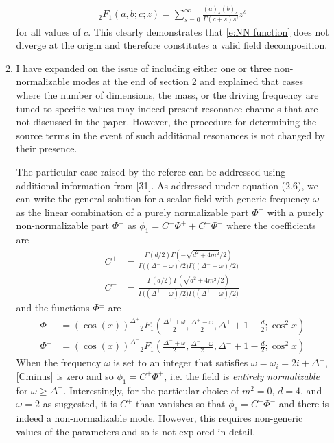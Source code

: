 \documentclass[11pt,letterpaper]{article}
\begin{document}
\begin{enumerate}
\begin{enumerate}
\begin{align}
            {_2}F_1 (a, b; c; z) = \sum_{s = 0}^\infty \frac{(a)_s (b)_s}{\Gamma(c + s) s!} z^s
        \end{align}
        for all values of $c$. This clearly demonstrates that \eqref{e:NN function} does not
        diverge at the origin and therefore constitutes a valid field decomposition.
        \item I have expanded on the issue of including either one or three non-normalizable modes at the end of section 2 and explained that cases where the number of dimensions, the mass, or the driving frequency are tuned to specific values may indeed present resonance channels that are not discussed in the paper. However, the procedure for determining the source terms in the event of such additional resonances is not changed by their presence. 
        
        The particular case raised by the referee can be addressed using additional information from [31]. As addressed under equation (2.6), we can write the general solution for a scalar field with generic frequency $\omega$ as the linear combination of a purely normalizable part $\Phi^+$ with a purely non-normalizable part $\Phi^-$ as ${\phi_1 = C^+ \Phi^+ + C^- \Phi^-}$ where the coefficients are
        \begin{align}
            \label{Cplus}
            C^+ &= \frac{\Gamma(d/2) \Gamma(- \sqrt{d^2 + 4m^2} / 2)}{\Gamma\Big( (\Delta^- + \omega)/2 \Big) \Gamma\Big( (\Delta^- - \omega) / 2 \Big)} \\
            \label{Cminus}
            C^- &= \frac{\Gamma(d/2) \Gamma(\sqrt{d^2 + 4m^2} / 2)}{\Gamma \Big( (\Delta^+ + \omega) / 2 \Big) \Gamma \Big( (\Delta^+ - \omega) / 2 \Big)} \, 
        \end{align}
        and the functions $\Phi^\pm$ are
        \begin{align}
            \label{Phiplus}
            \Phi^+ &= \left( \cos(x) \right)^{\Delta^+} {_2}F_1 \left( \frac{\Delta^+ + \omega}{2}, \frac{\Delta^+ - \omega}{2}, \Delta^+ +1 - \frac{d}{2}; \cos^2 x \right) \\
            \label{Phiminus}
            \Phi^- &= \left( \cos(x) \right)^{\Delta^-} {_2}F_1 \left( \frac{\Delta^- + \omega}{2}, \frac{\Delta^- - \omega}{2}, \Delta^- + 1 - \frac{d}{2} ; \cos^2 x \right)
        \end{align}
        When the frequency $\omega$ is set to an integer that satisfies ${\omega = \omega_i = 2i + \Delta^+}$, \eqref{Cminus} is zero and so $\phi_1 = C^+ \Phi^+$, i.e. the field is \emph{entirely normalizable} for $\omega \geq \Delta^+$. Interestingly, for the particular choice of $m^2 = 0$, $d=4$, and $\omega = 2$ as suggested, it is $C^+$ than vanishes so that $\phi_1 = C^- \Phi^-$ and there is indeed a non-normalizable mode. However, this requires non-generic values of the parameters and so is not explored in detail.


\end{enumerate}
\end{enumerate}
\end{document}
